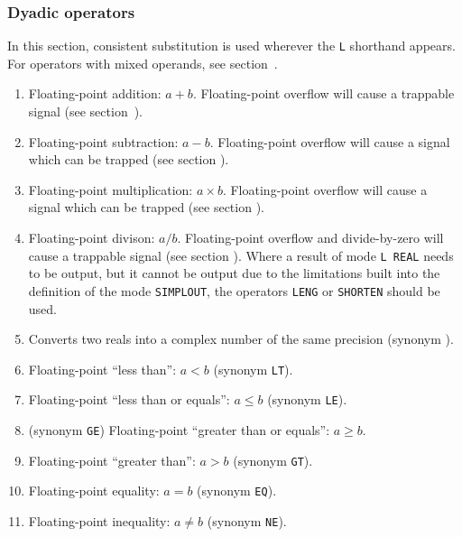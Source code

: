 \subsubsection*{Dyadic operators}
In this section, consistent substitution is used wherever the \verb|L|
shorthand appears. For operators with mixed operands, see
section~.
\begin{enumerate}
\item {} \newline
Floating-point addition: $a+b$. Floating-point overflow will cause a
trappable signal (see section~).
\item {} \newline
Floating-point subtraction: $a-b$. Floating-point overflow will cause a
signal which can be trapped (see section ).
\item {} \newline
Floating-point multiplication: $a\times b$. Floating-point overflow
will cause a signal which can be trapped (see section ).
\item {} \newline
Floating-point divison: $a/b$. Floating-point overflow and
divide-by-zero will cause a trappable signal (see
section ). Where a result of mode \verb|L REAL| needs to
be output, but it cannot be output due to the limitations built into
the definition of the mode \verb|SIMPLOUT|, the operators \verb|LENG|
or \verb|SHORTEN| should be used.
\item {}\newline
Converts two reals into a complex number of the same precision
(synonym ).
\item {}\newline
Floating-point ``less than'': $a<b$ (synonym \verb|LT|).
\item {}\newline
Floating-point ``less than or equals'': $a\leq b$ (synonym \verb|LE|).
\item {}
\newline(synonym \verb|GE|)\newline
Floating-point ``greater than or equals'': $a\geq b$.
\item {}\newline
Floating-point ``greater than'': $a>b$ (synonym \verb|GT|).
\item {}\newline
Floating-point equality: $a=b$ (synonym \verb|EQ|).
\item {}\newline
Floating-point inequality: $a\neq b$ (synonym \verb|NE|).
\end{enumerate}

